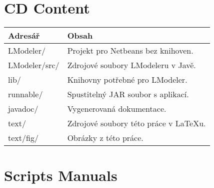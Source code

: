 \chapter{CD Content}


\begin{table}[h]
	\centering
	\renewcommand{\arraystretch}{1.2}
	\begin{tabular}{|l|l|}
		\hline
		Adresář & Obsah  \\
		\hline
		\hline
		LModeler/ & Projekt pro Netbeans bez knihoven. \\
		LModeler/src/ & Zdrojové soubory LModeleru v Javě. \\
		lib/ & Knihovny potřebné pro LModeler. \\
		runnable/ & Spustitelný JAR soubor s aplikací.\\
		javadoc/ & Vygenerovaná dokumentace. \\
		text/ & Zdrojové soubory této práce v LaTeXu. \\
		text/fig/ & Obrázky z této práce. \\
		\hline
	\end{tabular}
	\label{tab:cdcontent}
\end{table}

\chapter{Scripts Manuals}

